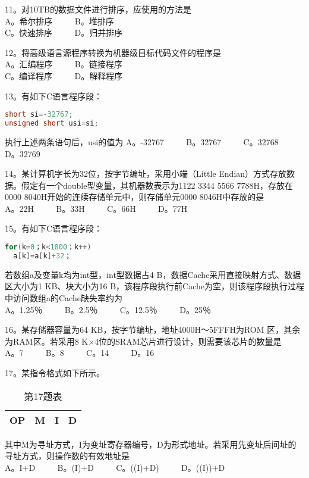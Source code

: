 11。对10TB的数据文件进行排序，应使用的方法是 \\
A。希尔排序 $\qquad$ B。堆排序 \\
C。快速排序 $\qquad$ D。归并排序

12。将高级语言源程序转换为机器级目标代码文件的程序是 \\
A。汇编程序 $\qquad$ B。链接程序 \\
C。编译程序 $\qquad$ D。解释程序

13。有如下C语言程序段： \\
\begin{lstlisting}[language=cpp]
short si=-32767;
unsigned short usi=si;
\end{lstlisting}
执行上述两条语句后，usi的值为
A。-32767 $\qquad$ B。32767 $\qquad$ C。32768 $\qquad$ D。32769

14。某计算机字长为32位，按字节编址，采用小端（Little Endian）方式存放数据。假定有一个double型变量，其机器数表示为1122 3344 5566 7788H，存放在0000 8040H开始的连续存储单元中，则存储单元0000 8046H中存放的是 \\
A。22H $\qquad$ B。33H $\qquad$ C。66H $\qquad$ D。77H

15。有如下C语言程序段： \\
\begin{lstlisting}[language=cpp]
for(k=0；k<1000；k++)
  a[k]=a[k]+32；
\end{lstlisting}
若数组a及变量k均为int型，int型数据占4 B，数据Cache采用直接映射方式、数据区大小为1 KB、块大小为16 B，该程序段执行前Cache为空，则该程序段执行过程中访问数组a的Cache缺失率约为 \\
A。1.25％ $\qquad$ B。2.5％ $\qquad$ C。12.5％ $\qquad$ D。25％

16。某存储器容量为64 KB，按字节编址，地址4000H～5FFFH为ROM 区，其余为RAM区。若采用8 K×4位的SRAM芯片进行设计，则需要该芯片的数量是 \\
A。7 $\qquad$ B。8 $\qquad$ C。14 $\qquad$ D。16

17。某指令格式如下所示。
\begin{table}[ht]
\centering
\caption{第17题表}\label{tab_CSN16_3}
\begin{tabular}{|c|c|c|c|}
\hline
OP & M & I & D \\
\hline
\end{tabular}
\end{table}
其中M为寻址方式，I为变址寄存器编号，D为形式地址。若采用先变址后间址的寻址方式，则操作数的有效地址是 \\
A。I+D $\qquad$ B。(I)+D $\qquad$ C。((I)+D) $\qquad$ D。((I))+D

